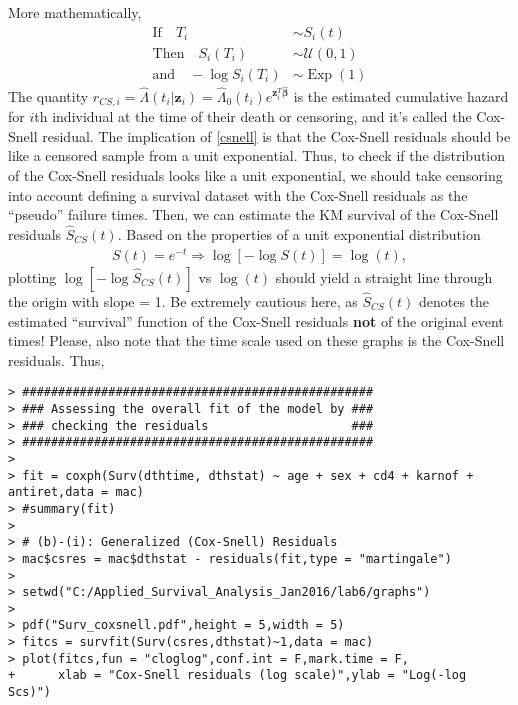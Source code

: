 \begin{enumerate}[(a)]
\begin{enumerate}[(i)]
More mathematically,
\begin{align}
\text{If}\quad T_{i} &\sim S_{i}(t) \nonumber \\
\text{Then}\quad S_{i}(T_{i}) &\sim \mathcal{U}(0,1) \nonumber \\
\text{and}\quad -\log S_{i}(T_{i}) &\sim \operatorname{Exp}(1) \label{csnell}
\end{align}
The quantity $r_{CS,i}=\hat{\Lambda}(t_{i}|\mathbf{z}_{i})=\hat{\Lambda}_{0}(t_{i})e^{\mathbf{z}_{i}^{T}\hat{\boldsymbol{\beta}}}
$ is the estimated cumulative hazard for $i$th individual at the time of their death or censoring, and it's called the Cox-Snell residual. The implication of \eqref{csnell} is that the Cox-Snell residuals should be like a censored sample from a unit exponential. Thus, to check if the distribution of the Cox-Snell residuals looks like a unit exponential, we should take censoring into account defining a survival dataset with the Cox-Snell residuals as the
“pseudo” failure times. Then, we can estimate the KM survival of the Cox-Snell residuals $\hat{S}_{CS}(t)$. Based on the properties of a unit exponential distribution
\begin{align}
S(t) = e^{-t} \Rightarrow \log\left[-\log S(t)\right] = \log(t), \nonumber
\end{align}
plotting $\log\left[-\log \hat{S}_{CS}(t)\right]$ vs $\log(t)$ should yield a straight line
through the origin with slope = 1. Be extremely cautious here, as $\hat{S}_{CS}(t)$ denotes the estimated “survival” function of the Cox-Snell residuals \textbf{not} of the original event times! Please, also note that the time scale used on these graphs is the Cox-Snell residuals. Thus,
\begin{spacing}{1.2}
\begin{footnotesize}
\begin{verbatim}
> #################################################
> ### Assessing the overall fit of the model by ###
> ### checking the residuals                    ###
> #################################################
> 
> fit = coxph(Surv(dthtime, dthstat) ~ age + sex + cd4 + karnof + antiret,data = mac)
> #summary(fit)
> 
> # (b)-(i): Generalized (Cox-Snell) Residuals
> mac$csres = mac$dthstat - residuals(fit,type = "martingale")
> 
> setwd("C:/Applied_Survival_Analysis_Jan2016/lab6/graphs")
> 
> pdf("Surv_coxsnell.pdf",height = 5,width = 5)
> fitcs = survfit(Surv(csres,dthstat)~1,data = mac)
> plot(fitcs,fun = "cloglog",conf.int = F,mark.time = F, 
+      xlab = "Cox-Snell residuals (log scale)",ylab = "Log(-log Scs)")

\end{verbatim}
\end{footnotesize}
\end{spacing}
\end{enumerate}
\end{enumerate}
